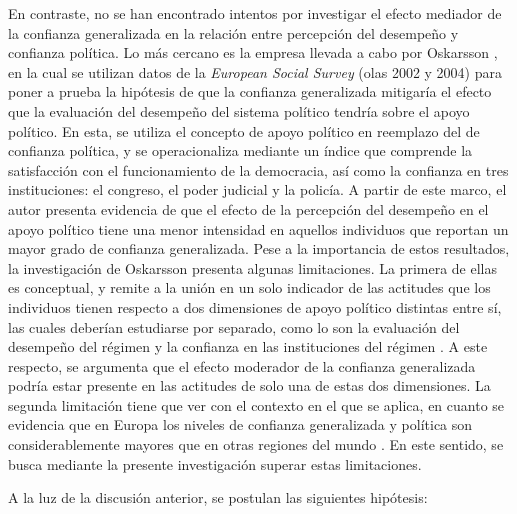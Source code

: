 \documentclass[12pt,twoside]{templates/facsothesis}
\begin{document}
En contraste, no se han encontrado intentos por investigar el efecto mediador de la confianza generalizada en la relación entre percepción del desempeño y confianza política. Lo más cercano es la empresa llevada a cabo por Oskarsson \citeyearpar{oskarssonGeneralizedTrustPolitical2010}, en la cual se utilizan datos de la \emph{European Social Survey} (olas 2002 y 2004) para poner a prueba la hipótesis de que la confianza generalizada mitigaría el efecto que la evaluación del desempeño del sistema político tendría sobre el apoyo político. En esta, se utiliza el concepto de apoyo político en reemplazo del de confianza política, y se operacionaliza mediante un índice que comprende la satisfacción con el funcionamiento de la democracia, así como la confianza en tres instituciones: el congreso, el poder judicial y la policía. A partir de este marco, el autor presenta evidencia de que el efecto de la percepción del desempeño en el apoyo político tiene una menor intensidad en aquellos individuos que reportan un mayor grado de confianza generalizada. Pese a la importancia de estos resultados, la investigación de Oskarsson presenta algunas limitaciones. La primera de ellas es conceptual, y remite a la unión en un solo indicador de las actitudes que los individuos tienen respecto a dos dimensiones de apoyo político distintas entre sí, las cuales deberían estudiarse por separado, como lo son la evaluación del desempeño del régimen y la confianza en las instituciones del régimen \citep{norrisDemocraticDeficitCritical2011}. A este respecto, se argumenta que el efecto moderador de la confianza generalizada podría estar presente en las actitudes de solo una de estas dos dimensiones. La segunda limitación tiene que ver con el contexto en el que se aplica, en cuanto se evidencia que en Europa los niveles de confianza generalizada y política son considerablemente mayores que en otras regiones del mundo \citep{bargstedSocialPoliticalTrust2023, mattesSocialPoliticalTrust2018}. En este sentido, se busca mediante la presente investigación superar estas limitaciones.

A la luz de la discusión anterior, se postulan las siguientes hipótesis:
\end{document}
